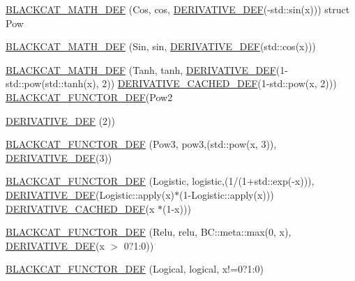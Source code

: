 \begin{DoxyCompactItemize}
\item 
\hyperlink{namespaceBC_1_1oper_1_1cmath__functions_a78d10c1677862f9bbbda57d357fb9756}{B\+L\+A\+C\+K\+C\+A\+T\+\_\+\+M\+A\+T\+H\+\_\+\+D\+EF} (Cos, cos, \hyperlink{namespaceBC_1_1oper_1_1cmath__functions_a078f98e4afdccf3b6305572a2b8007d5}{D\+E\+R\+I\+V\+A\+T\+I\+V\+E\+\_\+\+D\+EF}(-\/std\+::sin(x))) struct Pow
\item 
\hyperlink{namespaceBC_1_1oper_1_1cmath__functions_a3aa486fe539332036c03aac29b6ea91b}{B\+L\+A\+C\+K\+C\+A\+T\+\_\+\+M\+A\+T\+H\+\_\+\+D\+EF} (Sin, sin, \hyperlink{namespaceBC_1_1oper_1_1cmath__functions_a078f98e4afdccf3b6305572a2b8007d5}{D\+E\+R\+I\+V\+A\+T\+I\+V\+E\+\_\+\+D\+EF}(std\+::cos(x)))
\item 
\hyperlink{namespaceBC_1_1oper_1_1cmath__functions_a52e3ff57f2c6006b617c5338f6698918}{B\+L\+A\+C\+K\+C\+A\+T\+\_\+\+M\+A\+T\+H\+\_\+\+D\+EF} (Tanh, tanh, \hyperlink{namespaceBC_1_1oper_1_1cmath__functions_a078f98e4afdccf3b6305572a2b8007d5}{D\+E\+R\+I\+V\+A\+T\+I\+V\+E\+\_\+\+D\+EF}(1-\/std\+::pow(std\+::tanh(x), 2)) \hyperlink{CMath_8h_a1775859539e05441b6c8b1489c328ed7}{D\+E\+R\+I\+V\+A\+T\+I\+V\+E\+\_\+\+C\+A\+C\+H\+E\+D\+\_\+\+D\+EF}(1-\/std\+::pow(x, 2))) \hyperlink{namespaceBC_1_1oper_1_1cmath__functions_a6577c214d4b5166b2ac292e87a6577f3}{B\+L\+A\+C\+K\+C\+A\+T\+\_\+\+F\+U\+N\+C\+T\+O\+R\+\_\+\+D\+EF}(Pow2
\item 
\hyperlink{namespaceBC_1_1oper_1_1cmath__functions_a078f98e4afdccf3b6305572a2b8007d5}{D\+E\+R\+I\+V\+A\+T\+I\+V\+E\+\_\+\+D\+EF} (2))
\item 
\hyperlink{namespaceBC_1_1oper_1_1cmath__functions_a6577c214d4b5166b2ac292e87a6577f3}{B\+L\+A\+C\+K\+C\+A\+T\+\_\+\+F\+U\+N\+C\+T\+O\+R\+\_\+\+D\+EF} (Pow3, pow3,(std\+::pow(x, 3)), \hyperlink{namespaceBC_1_1oper_1_1cmath__functions_a078f98e4afdccf3b6305572a2b8007d5}{D\+E\+R\+I\+V\+A\+T\+I\+V\+E\+\_\+\+D\+EF}(3))
\item 
\hyperlink{namespaceBC_1_1oper_1_1cmath__functions_a0a3baca1513600b3224b532b21fccec5}{B\+L\+A\+C\+K\+C\+A\+T\+\_\+\+F\+U\+N\+C\+T\+O\+R\+\_\+\+D\+EF} (Logistic, logistic,(1/(1+std\+::exp(-\/x))), \hyperlink{namespaceBC_1_1oper_1_1cmath__functions_a078f98e4afdccf3b6305572a2b8007d5}{D\+E\+R\+I\+V\+A\+T\+I\+V\+E\+\_\+\+D\+EF}(Logistic\+::apply(x)$\ast$(1-\/Logistic\+::apply(x))) \hyperlink{CMath_8h_a1775859539e05441b6c8b1489c328ed7}{D\+E\+R\+I\+V\+A\+T\+I\+V\+E\+\_\+\+C\+A\+C\+H\+E\+D\+\_\+\+D\+EF}(x $\ast$(1-\/x)))
\item 
\hyperlink{namespaceBC_1_1oper_1_1cmath__functions_a5e7c2f4ab315a052e9c3661917376660}{B\+L\+A\+C\+K\+C\+A\+T\+\_\+\+F\+U\+N\+C\+T\+O\+R\+\_\+\+D\+EF} (Relu, relu, B\+C\+::meta\+::max(0, x), \hyperlink{namespaceBC_1_1oper_1_1cmath__functions_a078f98e4afdccf3b6305572a2b8007d5}{D\+E\+R\+I\+V\+A\+T\+I\+V\+E\+\_\+\+D\+EF}(x $>$ 0?1\+:0))
\item 
\hyperlink{namespaceBC_1_1oper_1_1cmath__functions_ade0134a7d086a3c7ef0eced5e77b4f1b}{B\+L\+A\+C\+K\+C\+A\+T\+\_\+\+F\+U\+N\+C\+T\+O\+R\+\_\+\+D\+EF} (Logical, logical, x!=0?1\+:0)
\end{DoxyCompactItemize}

